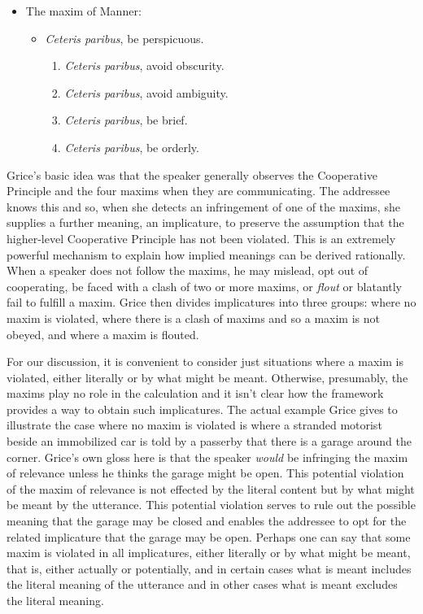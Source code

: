 \begin{description}[wide=0pt]
\begin{itemize}
 \item The maxim of Manner:
 \begin{itemize}
  \item \emph{Ceteris paribus}, be perspicuous.
  \begin{enumerate}[label=\alph*.]
   \item \emph{Ceteris paribus}, avoid obscurity.
   \item \emph{Ceteris paribus}, avoid ambiguity.
   \item \emph{Ceteris paribus}, be brief.
   \item \emph{Ceteris paribus}, be orderly.
  \end{enumerate}
 \end{itemize}
\end{itemize}
\end{description}


Grice's basic idea was that the speaker generally observes the Cooperative Principle and the four maxims when they are communicating. The addressee knows this and so, when she detects an infringement of one of the maxims, she supplies a further meaning, an implicature, to preserve the assumption that the higher-level Cooperative Principle has not been violated. This is an extremely powerful mechanism to explain how implied meanings can be derived rationally. When a speaker does not follow the maxims, he may mislead, opt out of cooperating, be faced with a clash of two or more maxims, or \emph{flout} or blatantly fail to fulfill a maxim. Grice then divides implicatures into three groups: where no maxim is violated, where there is a clash of maxims and so a maxim is not obeyed, and where a maxim is flouted. 

For our discussion, it is convenient to consider just situations where a maxim is violated, either literally or by what might be meant. Otherwise, presumably, the maxims play no role in the calculation and it isn't clear how the framework provides a way to obtain such implicatures. The actual example Grice gives to illustrate the case where no maxim is violated is where a stranded motorist beside an immobilized car is told by a passerby that there is a garage around the corner. Grice's own gloss here is that the speaker \emph{would} be infringing the maxim of relevance unless he thinks the garage might be open. This potential violation of the maxim of relevance is not effected by the literal content but by what might be meant by the utterance. This potential violation serves to rule out the possible meaning that the garage may be closed and enables the addressee to opt for the related implicature that the garage may be open. Perhaps one can say that some maxim is violated in all implicatures, either literally or by what might be meant, that is, either actually or potentially, and in certain cases what is meant includes the literal meaning of the utterance and in other cases what is meant excludes the literal meaning.\largerpage[-1]

